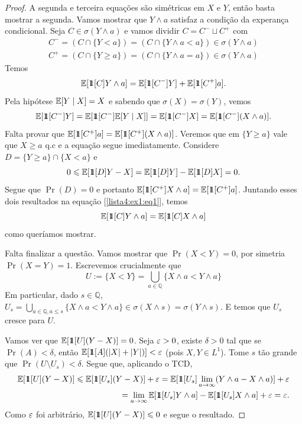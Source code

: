 \begin{proof}
	A segunda e terceira equações são simétricas em $X$ e $Y$, então
	basta mostrar a segunda. Vamos mostrar que $Y \land a$ satisfaz a
	condição da experança condicional.
	Seja $C \in \sigma(Y \land a)$ e vamos dividir $C = C^- \sqcup C^+$ com
	\begin{align*}
		C^- = (C \cap \{Y < a\}) = (C \cap \{Y \land a < a\}) \in \sigma(Y \land a)\\
		C^+ = (C \cap \{Y \geq a\}) = (C \cap \{Y \land a = a\}) \in \sigma(Y \land a)
	\end{align*}
	Temos
	\begin{equation}
		\label{lista4:ex1:eq1}
		\mathbb{E}[\hbox{$1\mkern-6.5mu1$}[C] Y \land a] = \mathbb{E}[\hbox{$1\mkern-6.5mu1$}[C^-]Y] + \mathbb{E}[\hbox{$1\mkern-6.5mu1$}[C^+] a].
	\end{equation}
	Pela hipótese $\mathbb{E}[Y \mid X] = X$ e sabendo que $\sigma(X) = \sigma(Y)$, vemos
	\[
		\mathbb{E}[\hbox{$1\mkern-6.5mu1$}[C^-]Y] = \mathbb{E}[ \hbox{$1\mkern-6.5mu1$}[C^-]\mathbb{E}[Y \mid X]] = \mathbb{E}[\hbox{$1\mkern-6.5mu1$}[C^-]X] =
		\mathbb{E}[\hbox{$1\mkern-6.5mu1$}[C^-](X \land a)].
	\]
	Falta provar que $\mathbb{E}[\hbox{$1\mkern-6.5mu1$}[C^+]a] = \mathbb{E}[\hbox{$1\mkern-6.5mu1$}[C^+](X \land a)]$.
	Veremos que em $\{Y \geq a\}$ vale que $X \geq a$ q.c e a equação
	segue imediatamente.
	Considere $D = \{Y \geq a\} \cap \{X < a\}$ e
	\[
		0 \leqslant \mathbb{E}[\hbox{$1\mkern-6.5mu1$}[D]Y - X] = \mathbb{E}[\hbox{$1\mkern-6.5mu1$}[D]Y] - \mathbb{E}[\hbox{$1\mkern-6.5mu1$}[D]X] = 0.
	\]
	Segue que $\Pr(D) = 0$ e portanto
	$\mathbb{E}[\hbox{$1\mkern-6.5mu1$}[C^+]X \land a] = \mathbb{E}[\hbox{$1\mkern-6.5mu1$}[C^+]a]$. Juntando esses dois
	resultados na equação [\ref{lista4:ex1:eq1}], temos
	\[
		\mathbb{E}[\hbox{$1\mkern-6.5mu1$}[C] Y \land a] = \mathbb{E}[\hbox{$1\mkern-6.5mu1$}[C] X \land a]
	\]
	como queríamos mostrar.

	Falta finalizar a questão. Vamos mostrar que $\Pr(X < Y) = 0$, por
	simetria $\Pr(X = Y) = 1$. Escrevemos crucialmente que
	\[
		U := \{X < Y\} = \bigcup_{a \in \mathbb{Q}} \{X \land a < Y \land a\}
	\]
	Em particular, dado $s \in \mathbb{Q}$, $U_s = \bigcup_{a \in
	\mathbb{Q}, a \leq s}\{X \land a < Y \land a\} \in \sigma(X \land s)
	= \sigma(Y \land s)$. E temos que
	$U_s$ cresce para $U$.

	Vamos ver que $\mathbb{E}[\hbox{$1\mkern-6.5mu1$}[U](Y - X)] = 0$. Seja $\varepsilon > 0$, existe
	$\delta > 0$ tal que se $\Pr(A) < \delta$, então $\mathbb{E}[\hbox{$1\mkern-6.5mu1$}[A] (|X| +
	|Y|)] < \varepsilon$ (pois $X,Y \in L^1$).
	Tome $s$ tão grande que $\Pr(U\setminus U_s) < \delta$. Segue que,
	aplicando o TCD,
	\begin{align*}
		\mathbb{E}[\hbox{$1\mkern-6.5mu1$}[U](Y - X)] \leqslant \mathbb{E}[\hbox{$1\mkern-6.5mu1$}[U_s] (Y - X)] + \varepsilon = \mathbb{E}[\hbox{$1\mkern-6.5mu1$}[U_s]
		\lim_{a \rightarrow \infty} (Y\land a - X\land a)] + \varepsilon\\
		= \lim_{a \rightarrow \infty} \mathbb{E}[\hbox{$1\mkern-6.5mu1$}[U_s] Y\land a] - \mathbb{E}[\hbox{$1\mkern-6.5mu1$}[U_s] X \land
		a] + \varepsilon = \varepsilon.
	\end{align*}
	Como $\varepsilon$ foi arbitrário, $\mathbb{E}[\hbox{$1\mkern-6.5mu1$}[U](Y - X)] \leqslant 0$ e segue o resultado.

\end{proof}

